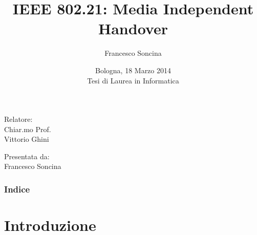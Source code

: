 \documentclass[10pt]{beamer}
\title[IEEE 802.21]{IEEE 802.21: Media Independent Handover} %
\author{Francesco Soncina} %
{
}
\date{Bologna, 18 Marzo 2014\\\vspace{1.5em}Tesi di Laurea in Informatica}
\begin{document}
\begin{frame}
\titlepage %
\begin{minipage}[t]{0.47\textwidth}
Relatore:\\
Chiar.mo Prof.\\
Vittorio Ghini
\end{minipage}
\hfill
\begin{minipage}[t]{0.47\textwidth}\raggedleft
Presentata da:\\
Francesco Soncina
\end{minipage}
\end{frame}

\begin{frame}
\frametitle{Indice} %
\tableofcontents %
\end{frame}


\section{Introduzione} %
\end{document}

